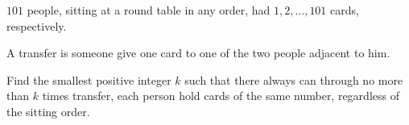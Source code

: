 $101$ people,  sitting at a round table in any order,  had  $1,2,... , 101$ cards,  respectively.

A transfer is someone give  one  card  to one of  the two people  adjacent to him.

Find the  smallest positive integer $k$ such that   there always  can  through  no more than  $ k $  times transfer,  each person  hold cards of the same number, regardless of  the sitting order.